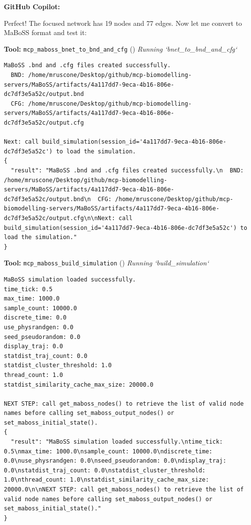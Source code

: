 \documentclass[11pt,a4paper]{article}
\begin{document}
\begin{copilotbox}
\textbf{GitHub Copilot:}

Perfect! The focused network has 19 nodes and 77 edges. Now let me convert to MaBoSS format and test it:

\end{copilotbox}
\begin{toolokbox}
\textbf{Tool:} \texttt{mcp\_maboss\_bnet\_to\_bnd\_and\_cfg} (\checkmark)
\textit{Running `bnet\_to\_bnd\_and\_cfg`}
\begin{lstlisting}
MaBoSS .bnd and .cfg files created successfully.
  BND: /home/mruscone/Desktop/github/mcp-biomodelling-servers/MaBoSS/artifacts/4a117dd7-9eca-4b16-806e-dc7df3e5a52c/output.bnd
  CFG: /home/mruscone/Desktop/github/mcp-biomodelling-servers/MaBoSS/artifacts/4a117dd7-9eca-4b16-806e-dc7df3e5a52c/output.cfg

Next: call build_simulation(session_id='4a117dd7-9eca-4b16-806e-dc7df3e5a52c') to load the simulation.
{
  "result": "MaBoSS .bnd and .cfg files created successfully.\n  BND: /home/mruscone/Desktop/github/mcp-biomodelling-servers/MaBoSS/artifacts/4a117dd7-9eca-4b16-806e-dc7df3e5a52c/output.bnd\n  CFG: /home/mruscone/Desktop/github/mcp-biomodelling-servers/MaBoSS/artifacts/4a117dd7-9eca-4b16-806e-dc7df3e5a52c/output.cfg\n\nNext: call build_simulation(session_id='4a117dd7-9eca-4b16-806e-dc7df3e5a52c') to load the simulation."
}
\end{lstlisting}
\end{toolokbox}
\begin{toolokbox}
\textbf{Tool:} \texttt{mcp\_maboss\_build\_simulation} (\checkmark)
\textit{Running `build\_simulation`}
\begin{lstlisting}
MaBoSS simulation loaded successfully.
time_tick: 0.5
max_time: 1000.0
sample_count: 10000.0
discrete_time: 0.0
use_physrandgen: 0.0
seed_pseudorandom: 0.0
display_traj: 0.0
statdist_traj_count: 0.0
statdist_cluster_threshold: 1.0
thread_count: 1.0
statdist_similarity_cache_max_size: 20000.0

NEXT STEP: call get_maboss_nodes() to retrieve the list of valid node names before calling set_maboss_output_nodes() or set_maboss_initial_state().
{
  "result": "MaBoSS simulation loaded successfully.\ntime_tick: 0.5\nmax_time: 1000.0\nsample_count: 10000.0\ndiscrete_time: 0.0\nuse_physrandgen: 0.0\nseed_pseudorandom: 0.0\ndisplay_traj: 0.0\nstatdist_traj_count: 0.0\nstatdist_cluster_threshold: 1.0\nthread_count: 1.0\nstatdist_similarity_cache_max_size: 20000.0\n\nNEXT STEP: call get_maboss_nodes() to retrieve the list of valid node names before calling set_maboss_output_nodes() or set_maboss_initial_state()."
}
\end{lstlisting}
\end{toolokbox}
\end{document}
